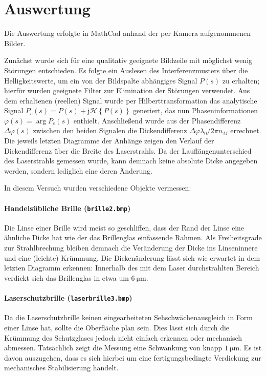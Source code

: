 \section{Auswertung}

Die Auswertung erfolgte in MathCad anhand der per Kamera aufgenommenen Bilder.

Zunächst wurde sich für eine qualitativ geeignete Bildzeile mit möglichst wenig Störungen entschieden. Es folgte ein Auslesen des Interferenzmusters über die Helligkeitswerte, um ein von der Bildspalte abhängiges Signal $P(s)$ zu erhalten; hierfür wurden geeignete Filter zur Elimination der Störungen verwendet. Aus dem erhaltenen (reellen) Signal wurde per Hilberttransformation das analytische Signal $P_c(s) = P(s) + \mathrm j \mathcal H\left\lbrace P(s) \right\rbrace$ generiert, das nun Phaseninformationen $\varphi(s)=\arg P_c(s)$ enthielt. Anschließend wurde aus der Phasendifferenz $\Delta\varphi(s)$  zwischen den beiden Signalen die Dickendifferenz $\Delta\varphi\lambda_0 / 2\pi n_M$ errechnet. Die jeweils letzten Diagramme der Anhänge zeigen den Verlauf der Dickendifferenz über die Breite des Laserstrahls. Da der Lauflängenunterschied des Laserstrahls gemessen wurde, kann demnach keine absolute Dicke angegeben werden, sondern lediglich eine deren Änderung.

In diesem Versuch wurden verschiedene Objekte vermessen:

\paragraph*{Handelsübliche Brille (\texttt{brille2.bmp})}

Die Linse einer Brille wird meist so geschliffen, dass der Rand der Linse eine ähnliche Dicke hat wie der das Brillenglas einfassende Rahmen. Als Freiheitsgrade zur Strahlbrechung bleiben demnach die Veränderung der Dicke ins Linseninnere und eine (leichte) Krümmung.
Die Dickenänderung lässt sich wie erwartet in dem letzten Diagramm erkennen: Innerhalb des mit dem Laser durchstrahlten Bereich verdickt sich das Brillenglas in etwa um $\SI{6}{\micro\meter}$.
 
\paragraph*{Laserschutzbrille (\texttt{laserbrille3.bmp})}
Da die Laserschutzbrille keinen eingearbeiteten Sehschwächenausgleich in Form einer Linse hat, sollte die Oberfläche plan sein. Dies lässt sich durch die Krümmung des Schutzglases jedoch nicht einfach erkennen oder mechanisch abmessen. 
Tatsächlich zeigt die Messung eine Schwankung von knapp $\SI{1}{\micro\meter}$. Es ist davon auszugehen, dass es sich hierbei um eine fertigungsbedingte Verdickung zur mechanisches Stabilisierung handelt.

